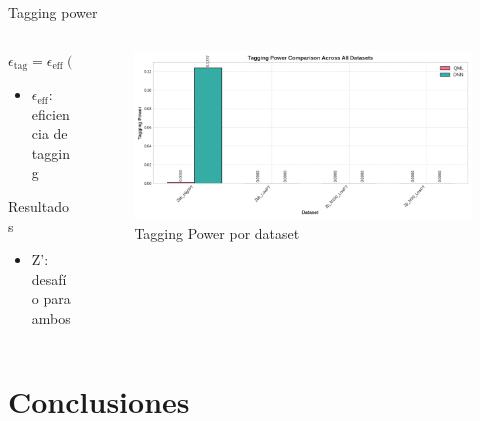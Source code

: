\documentclass[aspectratio=169]{beamer}
\begin{document}
\begin{frame}{Tagging power}
  \begin{columns}
    \begin{column}{0.48\textwidth}
      \begin{block}{\texorpdfstring{$\epsilon_{\text{tag}} = \epsilon_{\text{eff}}(2a-1)^2$}{Tagging power Formula}}
        \begin{itemize}
          \item \texorpdfstring{$\epsilon_{\text{eff}}$}{epsilon\_eff}: eficiencia de tagging
        \end{itemize}
      \end{block}
      \vspace{-0.2em}
      \begin{alertblock}{Resultados}
        \begin{itemize}
          \item Z': desafío para ambos
        \end{itemize}
      \end{alertblock}
    \end{column}
    \begin{column}{0.5\textwidth}
      \begin{figure}
        \includegraphics[width=\textwidth]{resumen_hmmm/tagging_power_all_datasets.png}
        \caption{\small Tagging Power por dataset}
      \end{figure}
    \end{column}
  \end{columns}
\end{frame}

\section{Conclusiones}
\end{document}
